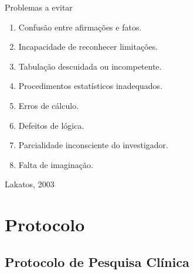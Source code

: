 \documentclass{beamer}
\begin{document}
\begin{frame}{Problemas a evitar}
  \begin{enumerate}
    \footnotesize
  \item Confusão entre afirmações e fatos. %
  \item Incapacidade de reconhecer limitações.%
  \item Tabulação descuidada ou incompetente. %
  \item Procedimentos estatísticos inadequados. %
  \item Erros de cálculo. %
  \item Defeitos de lógica.%
  \item Parcialidade inconsciente do investigador.%
  \item Falta de imaginação. %
  \end{enumerate}

  \vfill
  \scriptsize
  \hfill Lakatos, 2003
\end{frame}

\section{Protocolo}

\subsection{Protocolo de Pesquisa Clínica}
\end{document}
